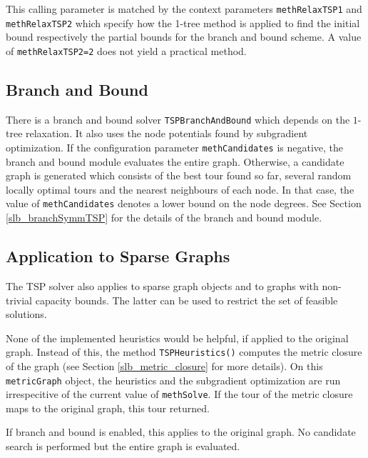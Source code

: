 \documentclass[a4paper,11pt,twoside]{book}
\begin{document}
\begin{multicols}{2}
This calling parameter is matched by the context parameters \verb/methRelaxTSP1/
and \verb/methRelaxTSP2/ which specify how the 1-tree method is applied to find
the initial bound respectively the partial bounds for the branch and bound scheme.
A value of \verb/methRelaxTSP2=2/ does not yield a practical method.


\subsection{Branch and Bound}
There is a branch and bound solver \verb/TSPBranchAndBound/ which depends on
the $1$-tree relaxation. It also uses the node potentials found by subgradient
optimization. If the configuration parameter \verb/methCandidates/ is negative,
the branch and bound module evaluates the entire graph. Otherwise, a candidate
graph is generated which consists of the best tour found so far, several random
locally optimal tours and the nearest neighbours of each node. In that case,
the value of \verb/methCandidates/ denotes a lower bound on the node degrees.
See Section \ref{slb_branchSymmTSP} for the details of the branch and bound module.


\subsection{Application to Sparse Graphs}
The TSP solver also applies to sparse graph objects and to graphs with
non-trivial capacity bounds. The latter can be used to restrict the
set of feasible solutions.

None of the implemented heuristics would be helpful, if applied to the original
graph. Instead of this, the method \verb/TSPHeuristics()/ computes the metric
closure of the graph (see Section \ref{slb_metric_closure} for
more details). On this \verb/metricGraph/ object, the heuristics
and the subgradient optimization are run irrespecitive of the current value
of \verb/methSolve/. If the tour of the metric closure maps to the original
graph, this tour returned.

If branch and bound is enabled, this applies to the original graph. No candidate
search is performed but the entire graph is evaluated.


\end{multicols}
\end{document}
